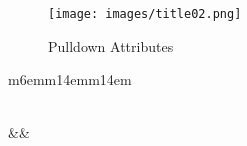 {\begin{figure}[hbtp]
    \centering
    \texttt{[image: images/title02.png]}
    \caption{Pulldown Attributes}
    \label{fig:title02}
\end{figure}

\begin{center}
    \small
    \begin{longtable}{{m{6em}m{14em}m{14em}}}
        \caption{Titler attributes}
        \label{tabular:titler} \\ %
        \toprule        
        &&\\        
        \midrule \endhead  %
        

\end{longtable}
\end{center}}
